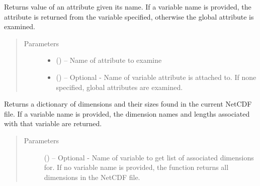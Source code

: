 \documentclass[a4paper,10pt,openany,english]{sphinxmanual}
\begin{document}
\begin{fulllineitems}
\begin{fulllineitems}
\begin{quote}
\begin{description}
\end{description}\end{quote}

\end{fulllineitems}


\begin{fulllineitems}
\label{egadsapi:egads.input.netcdf_io.NetCdf.get_attribute_value}
Returns value of an attribute given its name. If a variable name is provided,
the attribute is returned from the variable specified, otherwise the global
attribute is examined.
\begin{quote}\begin{description}
\item[{Parameters}] \leavevmode\begin{itemize}
\item {} 
 () -- Name of attribute to examine

\item {} 
 () -- Optional - Name of variable attribute is attached to. If none specified, global
attributes are examined.

\end{itemize}

\end{description}\end{quote}

\end{fulllineitems}


\begin{fulllineitems}
\label{egadsapi:egads.input.netcdf_io.NetCdf.get_dimension_list}
Returns a dictionary of dimensions and their sizes found in the current
NetCDF file. If a variable name is provided, the dimension names and
lengths associated with that variable are returned.
\begin{quote}\begin{description}
\item[{Parameters}] \leavevmode
{} () -- Optional - Name of variable to get list of associated dimensions for. If no variable
name is provided, the function returns all dimensions in the NetCDF file.


\end{description}
\end{quote}
\end{fulllineitems}
\end{fulllineitems}
\end{document}
